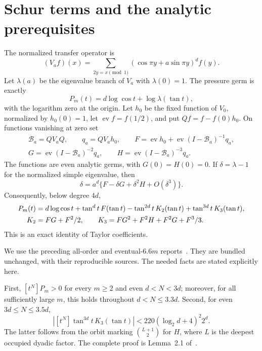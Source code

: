 \documentclass[11pt,a4paper]{article}
\theoremstyle{remark}\newtheorem*{ednote}{Editorial note (ProveIt, 2026-10-01)}
\newcommand{\ev}{\operatorname{ev}}\newcommand{\Z}{\mathbb Z}
\begin{document}
\section{Schur terms and the analytic prerequisites}
The normalized transfer operator is
\[
 (V_af)(x)=\sum_{2y=x\pmod1}(\cos\pi y+a\sin\pi y)^d f(y).
\]
Let $\lambda(a)$ be the eigenvalue branch of $V_a$ with $\lambda(0)=1$. The pressure germ is exactly
\[P_m(t)=d\log\cos t+\log\lambda(\tan t),\]
with the logarithm zero at the origin. Let $h_0$ be the fixed function of $V_0$, normalized by $h_0(0)=1$, let $\ev f=f(1/2)$, and put $Qf=f-f(0)h_0$. On functions vanishing at zero set
\begin{gather*}
 \mathcal B_a=QV_aQ,\qquad q_a=QV_ah_0,\qquad
 F=\ev h_0+\ev(I-\mathcal B_a)^{-1}q_a,\\
 G=\ev(I-\mathcal B_a)^{-2}q_a,\qquad
 H=\ev(I-\mathcal B_a)^{-3}q_a.
\end{gather*}
The functions are even analytic germs, with $G(0)=H(0)=0$. If $\delta=\lambda-1$ for the normalized simple eigenvalue, then
\[
 \delta=a^d\{F-\delta G+\delta^2H+O(\delta^3)\}.
\]
Consequently, below degree $4d$,
\begin{align}
 P_m(t)&=d\log\cos t+\tan^dt\,F(\tan t)
       -\tan^{2d}t\,K_2(\tan t)+\tan^{3d}t\,K_3(\tan t),\label{eq:schur}\\
 K_2&=FG+F^2/2,\qquad
 K_3=FG^2+F^2H+F^2G+F^3/3.\notag
\end{align}
This is an exact identity of Taylor coefficients.

We use the preceding all-order and eventual-$6.6m$ reports~\cite{AllOrders,Bound66}. They are bundled unchanged, with their reproducible sources. The needed facts are stated explicitly here.

First, $[t^N]P_m>0$ for every $m\ge2$ and even $d<N<3d$; moreover, for all sufficiently large $m$, this holds throughout $d<N\le3.3d$. Second, for even $3d\le N\le3.5d$,
\begin{equation}\label{eq:cubic}
 |[t^N]\tan^{3d}t\,K_3(\tan t)|
 <220(\log_2d+4)^2 2^d.
\end{equation}
The latter follows from the orbit marking $\binom{L+1}{2}$ for $H$, where $L$ is the deepest occupied dyadic factor. The complete proof is Lemma~2.1 of~\cite{Bound66}.
\end{document}
